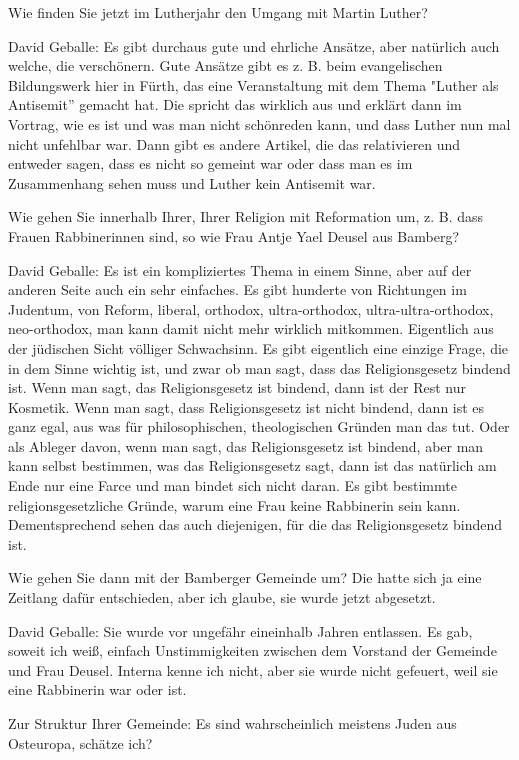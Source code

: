 Wie finden Sie jetzt im Lutherjahr den Umgang mit Martin Luther? 

David Geballe: Es gibt durchaus gute und ehrliche Ansätze, aber natürlich auch welche, die verschönern. Gute Ansätze gibt es z. B. beim evangelischen Bildungswerk hier in Fürth, das eine Veranstaltung mit dem Thema "Luther als Antisemit” gemacht hat. Die spricht das wirklich aus und erklärt dann im Vortrag, wie es ist und was man nicht schönreden kann, und dass Luther nun mal nicht unfehlbar war. Dann gibt es andere Artikel, die das relativieren und entweder sagen, dass es nicht so gemeint war oder dass man es im Zusammenhang sehen muss und Luther kein Antisemit war. 

 Wie gehen Sie innerhalb Ihrer, Ihrer Religion mit Reformation um, z. B. dass Frauen Rabbinerinnen sind, so wie Frau Antje Yael Deusel aus Bamberg? 

David Geballe: Es ist ein kompliziertes Thema in einem Sinne, aber auf der anderen Seite auch ein sehr einfaches. Es gibt hunderte von Richtungen im Judentum, von Reform, liberal, orthodox, ultra-orthodox, ultra-ultra-orthodox, neo-orthodox, man kann damit nicht mehr wirklich mitkommen. Eigentlich aus der jüdischen Sicht völliger Schwachsinn. Es gibt eigentlich eine einzige Frage, die in dem Sinne wichtig ist, und zwar ob man sagt, dass das Religionsgesetz bindend ist. 
Wenn man sagt, das Religionsgesetz ist bindend, dann ist der Rest nur Kosmetik. Wenn man sagt, dass Religionsgesetz ist nicht bindend, dann ist es ganz egal, aus was für philosophischen, theologischen Gründen man das tut. Oder als Ableger davon, wenn man sagt, das Religionsgesetz ist bindend, aber man kann selbst bestimmen, was das Religionsgesetz sagt, dann ist das natürlich am Ende nur eine Farce und man bindet sich nicht daran. Es gibt bestimmte religionsgesetzliche Gründe, warum eine Frau keine Rabbinerin sein kann. Dementsprechend sehen das auch diejenigen, für die das Religionsgesetz bindend ist. 

 Wie gehen Sie dann mit der Bamberger Gemeinde um? Die hatte sich ja eine Zeitlang dafür entschieden, aber ich glaube, sie wurde jetzt abgesetzt. 

David Geballe: Sie wurde vor ungefähr eineinhalb Jahren entlassen. Es gab, soweit ich weiß, einfach Unstimmigkeiten zwischen dem Vorstand der Gemeinde und Frau Deusel. Interna kenne ich nicht, aber sie wurde nicht gefeuert, weil sie eine Rabbinerin war oder ist. 

Zur Struktur Ihrer Gemeinde: Es sind wahrscheinlich meistens Juden aus Osteuropa, schätze ich? 

